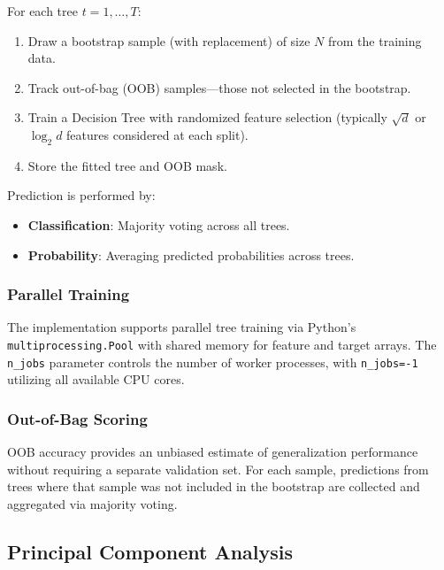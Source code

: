 \documentclass[conference,12pt]{IEEEtran}
\begin{document}
For each tree $t = 1, \ldots, T$:
\begin{enumerate}
    \item Draw a bootstrap sample (with replacement) of size $N$ from the training data.
    \item Track out-of-bag (OOB) samples---those not selected in the bootstrap.
    \item Train a Decision Tree with randomized feature selection (typically $\sqrt{d}$ or $\log_2 d$ features considered at each split).
    \item Store the fitted tree and OOB mask.
\end{enumerate}

Prediction is performed by:
\begin{itemize}
    \item \textbf{Classification}: Majority voting across all trees.
    \item \textbf{Probability}: Averaging predicted probabilities across trees.
\end{itemize}

\subsubsection{Parallel Training}

The implementation supports parallel tree training via Python's \texttt{multiprocessing.Pool} with shared memory for feature and target arrays. The \texttt{n\_jobs} parameter controls the number of worker processes, with \texttt{n\_jobs=-1} utilizing all available CPU cores.

\subsubsection{Out-of-Bag Scoring}

OOB accuracy provides an unbiased estimate of generalization performance without requiring a separate validation set. For each sample, predictions from trees where that sample was not included in the bootstrap are collected and aggregated via majority voting.

\subsection{Principal Component Analysis}
\end{document}
